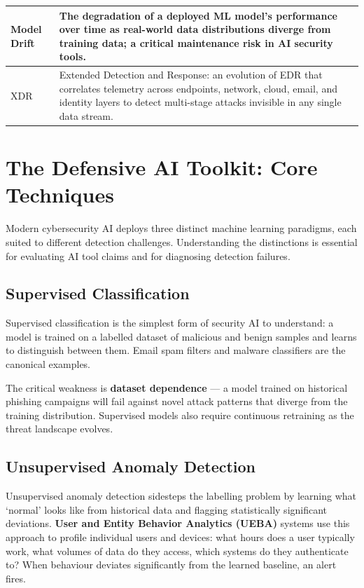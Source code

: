 \documentclass[12pt,a4paper]{article}
\begin{document}
\begin{center}
\begin{tabular}{|p{3cm}|p{10.5cm}|}
\hline
Model Drift & The degradation of a deployed ML model's performance over time as real-world data distributions diverge from training data; a critical maintenance risk in AI security tools. \\
\hline
XDR & Extended Detection and Response: an evolution of EDR that correlates telemetry across endpoints, network, cloud, email, and identity layers to detect multi-stage attacks invisible in any single data stream. \\
\hline
\end{tabular}
\end{center}

\section{The Defensive AI Toolkit: Core Techniques}

Modern cybersecurity AI deploys three distinct machine learning paradigms, each suited to different detection challenges. Understanding the distinctions is essential for evaluating AI tool claims and for diagnosing detection failures.

\subsection{Supervised Classification}
Supervised classification is the simplest form of security AI to understand: a model is trained on a labelled dataset of malicious and benign samples and learns to distinguish between them. Email spam filters and malware classifiers are the canonical examples.

The critical weakness is \textbf{dataset dependence} --- a model trained on historical phishing campaigns will fail against novel attack patterns that diverge from the training distribution. Supervised models also require continuous retraining as the threat landscape evolves.

\subsection{Unsupervised Anomaly Detection}
Unsupervised anomaly detection sidesteps the labelling problem by learning what `normal' looks like from historical data and flagging statistically significant deviations. \textbf{User and Entity Behavior Analytics (UEBA)} systems use this approach to profile individual users and devices: what hours does a user typically work, what volumes of data do they access, which systems do they authenticate to? When behaviour deviates significantly from the learned baseline, an alert fires.
\end{document}
